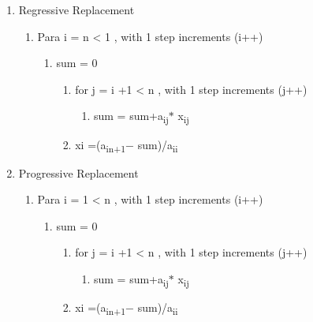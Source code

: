 \documentclass[12pt]{article}
\renewcommand{\_}{\kern-1.5pt\textunderscore\kern-1.5pt}
\begin{document}
\begin{enumerate}
	\item Regressive Replacement \par

\begin{enumerate}
	\item Para i = n < 1 , with 1 step increments (i++) \par

\begin{enumerate}
	\item sum = 0\par

\begin{enumerate}
	\item for j = i +1 < n , with 1 step increments (j++) \par

\begin{enumerate}
	\item sum = sum+a\textsubscript{ij}$\ast$ x\textsubscript{ij}\par


\end{enumerate}
	\item xi =(a\textsubscript{in+1}$-$ sum)/a\textsubscript{ii}\par


\end{enumerate}
\end{enumerate}
\end{enumerate}
	\item Progressive Replacement \par

\begin{enumerate}
	\item Para i = 1 < n , with 1 step increments (i++) \par

\begin{enumerate}
	\item sum = 0\par

\begin{enumerate}
	\item for j = i +1 < n , with 1 step increments (j++) \par

\begin{enumerate}
	\item sum = sum+a\textsubscript{ij}$\ast$ x\textsubscript{ij}\par


\end{enumerate}
	\item xi =(a\textsubscript{in+1}$-$ sum)/a\textsubscript{ii}
\end{enumerate}
\end{enumerate}
\end{enumerate}
\end{enumerate}\par


\vspace{\baselineskip}

\vspace{\baselineskip}

\printbibliography
\end{document}
